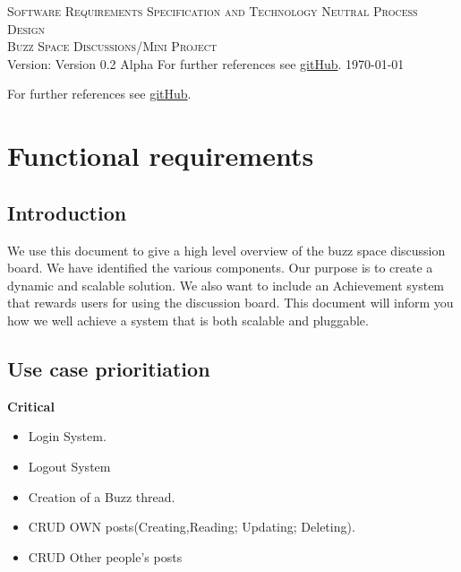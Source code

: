 \documentclass[a4paper,12pt]{report}
\begin{document}
\renewcommand{\thesection}{\arabic{section}}
\newpage
\begin{center}
\textsc{\LARGE Software Requirements Specification and Technology Neutral Process Design}\\[1.5cm]
\textsc{\Large Buzz Space Discussions/Mini Project}\\[0.5cm]
Version: Version 0.2 Alpha 
For further references see \href{http://www.sharelatex.com}{gitHub}.
\today
\end{center}
\tableofcontents{}
For further references see \href{http://www.sharelatex.com}{gitHub}.
\section{Functional requirements}
\subsection{Introduction}
We use this document to give a high level overview of the buzz space discussion board. We have identified the various components. Our purpose is to create a dynamic and scalable solution. We also want to include an Achievement system that rewards users for using the discussion board. This document will inform you how we well achieve a system that is both scalable and pluggable.
\subsection{Use case prioritiation}
\textbf{Critical} 
\begin{itemize}
  \item Login System.
	\begin{center}
	\end{center}
  \item Logout System
	\begin{center}
	\end{center}	
  \item Creation of a Buzz thread.
    \item CRUD OWN posts(Creating,Reading; Updating; Deleting).
	\begin{center}
	\end{center}
\item CRUD Other people's posts 
	\begin{center}
	\end{center}\end{itemize} 
\end{document}
